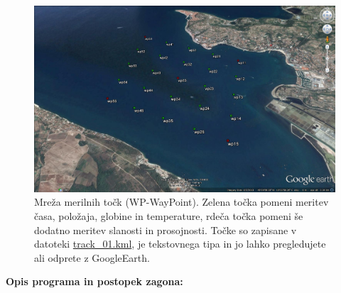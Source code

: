 \documentclass[11pt]{article}
\begin{document}
\begin{figure}[!h]
	\centering \includegraphics[width=12cm]{figs/track_01_02.jpg}
	\caption{Mreža merilnih točk (WP-WayPoint). Zelena točka pomeni meritev časa, položaja, globine in temperature, rdeča točka pomeni še dodatno meritev slanosti in prosojnosti. Točke so zapisane v datoteki \href{https://drive.google.com/open?id=0B1dT-CBA07ANWDI0dDdkc1p1TkU}{track\_01.kml}, je tekstovnega tipa in jo lahko pregledujete ali odprete z GoogleEarth.}
	\label{fig:v_est_wps}
\end{figure}

\newpage
\noindent
\textbf{Opis programa in postopek zagona:}
\vspace*{5mm}
\end{document}
